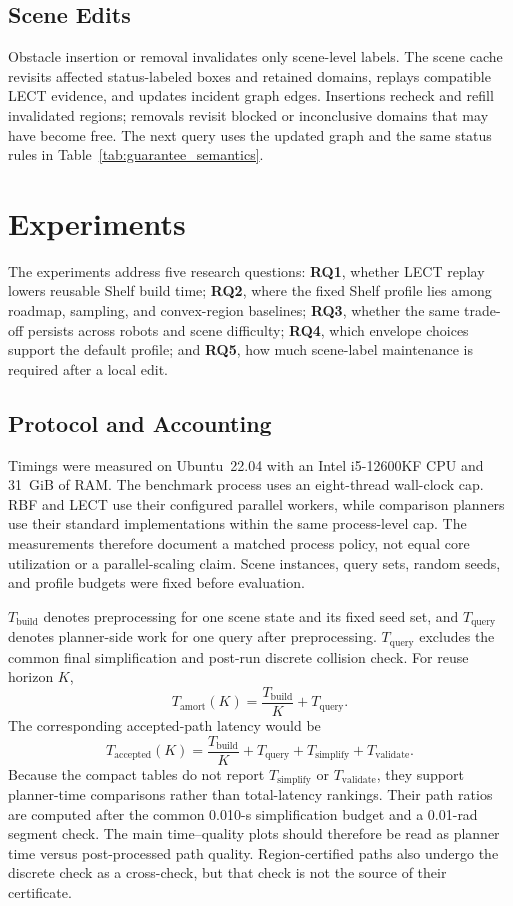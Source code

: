 \documentclass[journal]{IEEEtran}
\newcommand{\rbf}{RBF}
\newcommand{\Tbuild}{\ensuremath{T_{\mathrm{build}}}}
\newcommand{\Tquery}{\ensuremath{T_{\mathrm{query}}}}
\newcommand{\Tsimplify}{\ensuremath{T_{\mathrm{simplify}}}}
\newcommand{\Tvalidate}{\ensuremath{T_{\mathrm{validate}}}}
\newcommand{\Tamort}[1]{\ensuremath{T_{\mathrm{amort}}(#1)}}
\newcommand{\Taccepted}[1]{\ensuremath{T_{\mathrm{accepted}}(#1)}}
\begin{document}
\subsection{Scene Edits}

Obstacle insertion or removal invalidates only scene-level labels. The scene
cache revisits affected status-labeled boxes and retained domains, replays
compatible LECT evidence, and updates incident graph edges. Insertions recheck
and refill invalidated regions; removals revisit blocked or inconclusive domains
that may have become free. The next query uses the updated graph and the same
status rules in Table~\ref{tab:guarantee_semantics}.

\section{Experiments}\label{sec:exp}

The experiments address five research questions: \textbf{RQ1}, whether LECT
replay lowers reusable Shelf build time; \textbf{RQ2}, where the fixed Shelf
profile lies among roadmap, sampling, and convex-region baselines; \textbf{RQ3},
whether the same trade-off persists across robots and scene difficulty;
\textbf{RQ4}, which envelope choices support the default profile; and
\textbf{RQ5}, how much scene-label maintenance is required after a local edit.

\subsection{Protocol and Accounting}

Timings were measured on Ubuntu~22.04 with an Intel i5-12600KF CPU and 31~GiB of
RAM. The benchmark process uses an eight-thread wall-clock cap. \rbf{} and LECT
use their configured parallel workers, while comparison planners use their
standard implementations within the same process-level cap. The measurements
therefore document a matched process policy, not equal core utilization or a
parallel-scaling claim. Scene instances, query sets, random seeds, and profile budgets were fixed
before evaluation.

$\Tbuild$ denotes preprocessing for one scene state and its fixed seed set,
and $\Tquery$ denotes planner-side work for one query after preprocessing.
$\Tquery$ excludes the common final simplification and post-run discrete
collision check. For reuse horizon $K$,
\[
\Tamort{K}=\frac{\Tbuild}{K}+\Tquery.
\]
The corresponding accepted-path latency would be
\[
\Taccepted{K}=\frac{\Tbuild}{K}+\Tquery+\Tsimplify+\Tvalidate.
\]
Because the compact tables do not report $\Tsimplify$ or $\Tvalidate$, they
support planner-time comparisons rather than total-latency rankings. Their path
ratios are computed after the common 0.010-s simplification budget and a
0.01-rad segment check. The main time--quality plots should therefore be read as
planner time versus post-processed path quality. Region-certified paths also
undergo the discrete check as a cross-check, but that check is not the source of
their certificate.
\end{document}

